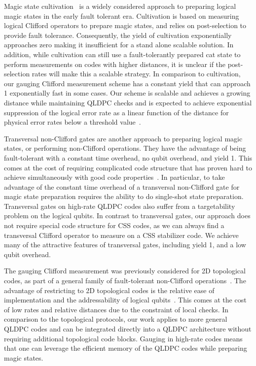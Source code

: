 \documentclass[11pt]{article}
\begin{document}
Magic state cultivation~\cite{Chamberland_2019,chamberland2020very,gidney2024magic,vaknin2026efficientmagicstatecultivation} is a widely considered approach to preparing logical magic states in the early fault tolerant era.
Cultivation is based on measuring logical Clifford operators to prepare magic states, and relies on post-selection to provide fault tolerance. Consequently, the yield of cultivation exponentially approaches zero making it insufficient for a stand alone scalable solution. In addition, while cultivation can still use a fault-tolerantly prepared cat state to perform measurements on codes with higher distances, it is unclear if the post-selection rates will make this a scalable strategy. In comparison to cultivation, our gauging Clifford measurement scheme has a constant yield that can approach 1 exponentially fast in some cases. Our scheme is scalable and achieves a growing distance while maintaining QLDPC checks and is expected to achieve exponential suppression of the logical error rate as a linear function of the distance for physical error rates below a threshold value~\cite{delafuente2026highthresholddecodingnonpaulicodes}. 

Transversal non-Clifford gates are another approach to preparing logical magic states, or performing non-Clifford operations. They have the advantage of being fault-tolerant with a constant time overhead, no qubit overhead, and yield 1. 
This comes at the cost of requiring complicated code structure that has proven hard to achieve simultaneously with good code properties~\cite{Zhu_2025, Breuckmann_2026, jacob2026singleshotdecodingfaulttolerantgates,Menon_2026,bauer2026findingdiagonallogicalgates,sahay2026computingqldpccodesclimbing}. 
In particular, to take advantage of the constant time overhead of a transversal non-Clifford gate for magic state preparation requires the ability to do single-shot state preparation. Transversal gates on high-rate QLDPC codes also suffer from a targetability problem on the logical qubits. 
In contrast to transversal gates, our approach does not require special code structure for CSS codes, as we can always find a transversal Clifford operator to measure on a CSS stabilizer code. We achieve many of the attractive features of transversal gates, including yield 1, and a low qubit overhead. 

The gauging Clifford measurement was previously considered for 2D topological codes, as part of a general family of fault-tolerant non-Clifford operations~\cite{Bauer_2026}. The advantage of restricting to 2D topological codes is the relative ease of implementation and the addressability of logical qubits~\cite{Fowler_2012}. This comes at the cost of low rates and relative distances due to the constraint of local checks. In comparison to the topological protocols, our work applies to more general QLDPC codes and can be integrated directly into a QLDPC architecture without requiring additional topological code blocks. 
Gauging in high-rate codes means that one can leverage the efficient memory of the QLDPC codes while preparing magic states.
\end{document}
